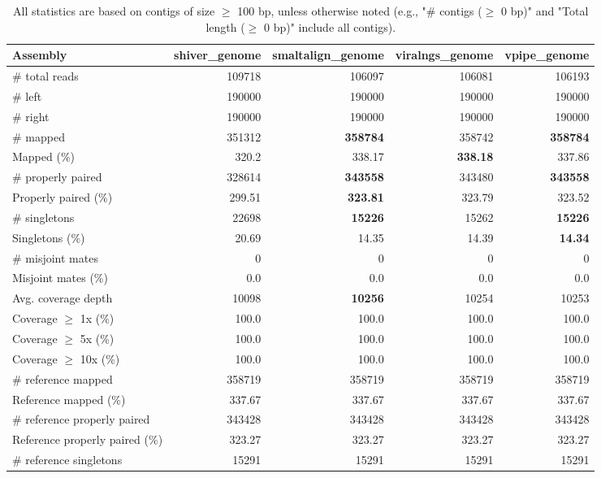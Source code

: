 \documentclass[12pt,a4paper]{article}
\begin{document}
\begin{table}[ht]
\begin{center}
\caption{All statistics are based on contigs of size $\geq$ 100 bp, unless otherwise noted (e.g., "\# contigs ($\geq$ 0 bp)" and "Total length ($\geq$ 0 bp)" include all contigs).}
\begin{tabular}{|l*{4}{|r}|}
\hline
Assembly & shiver\_genome & smaltalign\_genome & viralngs\_genome & vpipe\_genome \\ \hline
\# total reads & 109718 & 106097 & 106081 & 106193 \\ \hline
\# left & 190000 & 190000 & 190000 & 190000 \\ \hline
\# right & 190000 & 190000 & 190000 & 190000 \\ \hline
\# mapped & 351312 & {\bf 358784} & 358742 & {\bf 358784} \\ \hline
Mapped (\%) & 320.2 & 338.17 & {\bf 338.18} & 337.86 \\ \hline
\# properly paired & 328614 & {\bf 343558} & 343480 & {\bf 343558} \\ \hline
Properly paired (\%) & 299.51 & {\bf 323.81} & 323.79 & 323.52 \\ \hline
\# singletons & 22698 & {\bf 15226} & 15262 & {\bf 15226} \\ \hline
Singletons (\%) & 20.69 & 14.35 & 14.39 & {\bf 14.34} \\ \hline
\# misjoint mates & 0 & 0 & 0 & 0 \\ \hline
Misjoint mates (\%) & 0.0 & 0.0 & 0.0 & 0.0 \\ \hline
Avg. coverage depth & 10098 & {\bf 10256} & 10254 & 10253 \\ \hline
Coverage $\geq$ 1x (\%) & 100.0 & 100.0 & 100.0 & 100.0 \\ \hline
Coverage $\geq$ 5x (\%) & 100.0 & 100.0 & 100.0 & 100.0 \\ \hline
Coverage $\geq$ 10x (\%) & 100.0 & 100.0 & 100.0 & 100.0 \\ \hline
\# reference mapped & 358719 & 358719 & 358719 & 358719 \\ \hline
Reference mapped (\%) & 337.67 & 337.67 & 337.67 & 337.67 \\ \hline
\# reference properly paired & 343428 & 343428 & 343428 & 343428 \\ \hline
Reference properly paired (\%) & 323.27 & 323.27 & 323.27 & 323.27 \\ \hline
\# reference singletons & 15291 & 15291 & 15291 & 15291 \\ \hline

\end{tabular}
\end{center}
\end{table}
\end{document}

